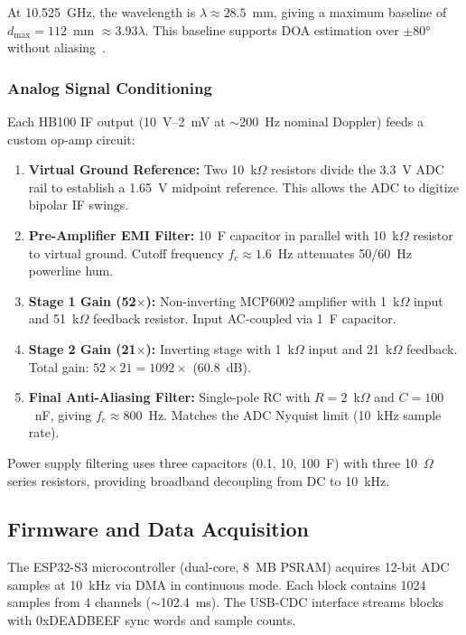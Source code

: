 \documentclass[10pt,a4paper]{article}
\begin{document}
At 10.525~GHz, the wavelength is $\lambda \approx 28.5$~mm, giving a maximum baseline of
$d_{\max} = 112$~mm $\approx 3.93\lambda$. This baseline supports DOA estimation over $\pm 80°$
without aliasing~\cite{Monzingo2011}.

\subsubsection{Analog Signal Conditioning}

Each HB100 IF output (10~\textmu V--2~mV at $\sim$200~Hz nominal Doppler) feeds a custom
op-amp circuit:

\begin{enumerate}
\item \textbf{Virtual Ground Reference:} Two 10~k$\Omega$ resistors divide the 3.3~V ADC rail
  to establish a 1.65~V midpoint reference. This allows the ADC to digitize bipolar IF swings.

\item \textbf{Pre-Amplifier EMI Filter:} 10~\textmu F capacitor in parallel with 10~k$\Omega$
  resistor to virtual ground. Cutoff frequency $f_c \approx 1.6$~Hz attenuates 50/60~Hz powerline hum.

\item \textbf{Stage 1 Gain (52$\times$):} Non-inverting MCP6002 amplifier with 1~k$\Omega$ input
  and 51~k$\Omega$ feedback resistor. Input AC-coupled via 1~\textmu F capacitor.

\item \textbf{Stage 2 Gain (21$\times$):} Inverting stage with 1~k$\Omega$ input and 21~k$\Omega$ feedback.
  Total gain: $52 \times 21 = 1092\times$ (60.8~dB).

\item \textbf{Final Anti-Aliasing Filter:} Single-pole RC with $R = 2$~k$\Omega$ and $C = 100$~nF,
  giving $f_c \approx 800$~Hz. Matches the ADC Nyquist limit (10~kHz sample rate).
\end{enumerate}

Power supply filtering uses three capacitors (0.1, 10, 100~\textmu F) with three 10~$\Omega$ series
resistors, providing broadband decoupling from DC to 10~kHz.

\subsection{Firmware and Data Acquisition}

The ESP32-S3 microcontroller (dual-core, 8~MB PSRAM) acquires 12-bit ADC samples at 10~kHz via
DMA in continuous mode. Each block contains 1024 samples from 4 channels ($\sim$102.4~ms).
The USB-CDC interface streams blocks with 0xDEADBEEF sync words and sample counts.
\end{document}
